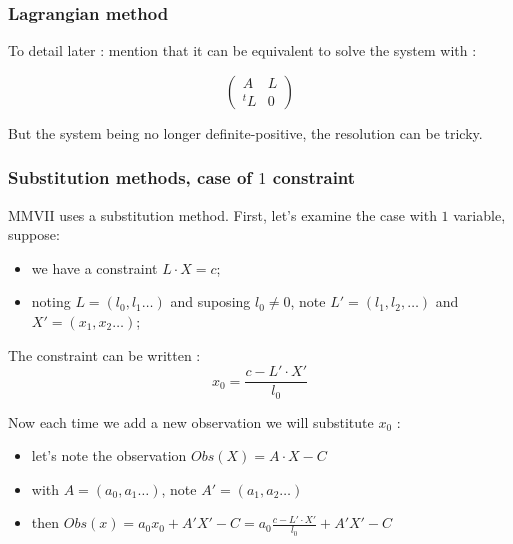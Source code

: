 
\subsubsection{Lagrangian method}

To detail later : mention that it can be equivalent to solve the system with :

\begin{equation}
  \begin{pmatrix}
   A & L \\
   ^t L & 0 
  \end{pmatrix}
\end{equation}

But the system being no longer definite-positive, the resolution can be tricky.


\subsubsection{Substitution methods, case of $1$ constraint}
\label{CSTR:SUBST}

MMVII uses a substitution method. First, let's examine the case with $1$ variable, suppose:

\begin{itemize}
    \item we have a constraint $L \cdot X = c$;
    \item noting $L= (l_0,l_1 \dots)$ and suposing $l_0 \neq 0$,  note $L'=(l_1,l_2, \dots)$ and $X'=(x_1,x_2\dots)$;
\end{itemize}


The constraint can be written :
\begin{equation}
    x_0 = \frac{c-L' \cdot X'}{l_0} \label{LSQ:SUBST}
\end{equation}

Now  each time we add a new observation we will substitute $x_0$ :

\begin{itemize}
      \item let's note the observation  $Obs(X) = A \cdot X - C$
      \item with $A= (a_0,a_1 \dots)$, note  $A' = (a_1,a_2 \dots) $
       \item then   $Obs(x) = a_0 x_0 + A' X'-C= a_0\frac{c-L' \cdot X'}{l_0} + A'X' -C$
\end{itemize}

